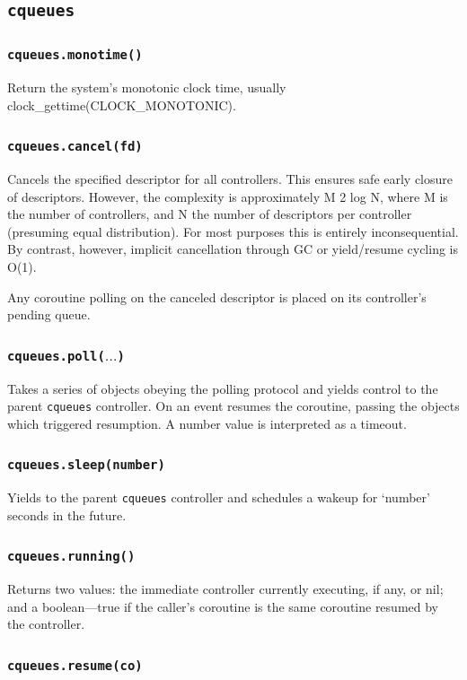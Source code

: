 \documentclass[11pt, oneside]{memoir}
\newcommand*{\cqueues}[0]{\texttt{cqueues}\xspace}
\newcommand*{\routine}[1]{\texttt{#1}\xspace}
\newcounter{toccols}
\newenvironment{Module}[1]{
	\subsection{\texttt{#1}}
	\addtocontents{toc}{
		\protect\begin{multicols}{\value{toccols}}
	}
}{
	\addtocontents{toc}{\protect\end{multicols}}
}
\begin{document}
\begin{Module}{\cqueues}
\subsubsection[\routine{cqueues.monotime}]{\routine{cqueues.monotime()}}
Return the system's monotonic clock time, usually clock\_gettime(CLOCK\_MONOTONIC).

\subsubsection[\routine{cqueues.cancel}]{\routine{cqueues.cancel(fd)}}
Cancels the specified descriptor for all controllers. This ensures safe early closure of descriptors. However, the complexity is approximately M 2 log N, where M is the number of controllers, and N the number of descriptors per controller (presuming equal distribution). For most purposes this is entirely inconsequential. By contrast, however, implicit cancellation through GC or yield/resume cycling is O(1).

Any coroutine polling on the canceled descriptor is placed on its controller's pending queue.

\subsubsection[\routine{cqueues.poll}]{\routine{cqueues.poll($\ldots$)}}
Takes a series of objects obeying the polling protocol and yields control to the parent \cqueues controller. On an event resumes the coroutine, passing the objects which triggered resumption. A number value is interpreted as a timeout.

\subsubsection[\routine{cqueues.sleep}]{\routine{cqueues.sleep(number)}}

Yields to the parent \cqueues controller and schedules a wakeup for `number' seconds in the future.

\subsubsection[\routine{cqueues.running}]{\routine{cqueues.running()}}

Returns two values: the immediate controller currently executing, if any, or nil; and a boolean---true if the caller's coroutine is the same coroutine resumed by the controller.

\subsubsection[\routine{cqueues.resume}]{\routine{cqueues.resume(co)}}


\end{Module}
\end{document}
